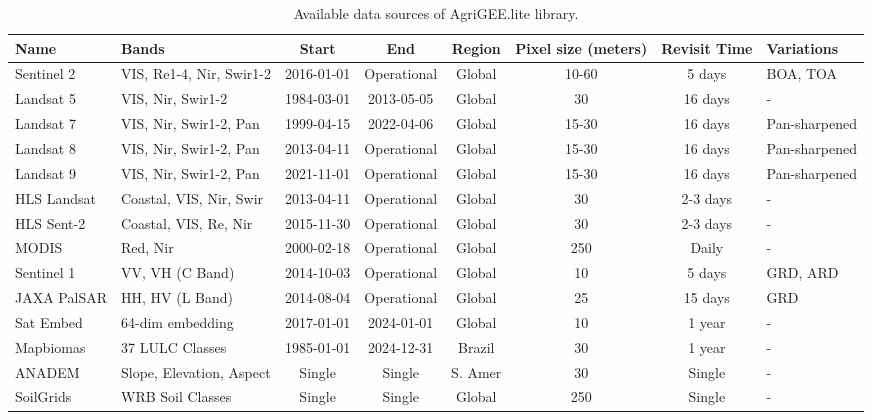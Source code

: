 \begin{landscape}
\begin{table}[ht]
\caption{Available data sources of AgriGEE.lite library.}
\centering
\small
\begin{tabular}{|l|p{4cm}|c|c|c|c|c|p{3cm}|}
\hline
\textbf{Name} & \textbf{Bands} & \textbf{Start} & \textbf{End} & \textbf{Region} & \textbf{Pixel size (meters)} & \textbf{Revisit Time} & \textbf{Variations} \\
\hline
Sentinel 2 & VIS, Re1-4, Nir, Swir1-2 & 2016-01-01 & Operational & Global & 10-60 & 5 days & BOA, TOA \\
\hline
Landsat 5 & VIS, Nir, Swir1-2 & 1984-03-01 & 2013-05-05 & Global & 30 & 16 days & - \\
\hline
Landsat 7 & VIS, Nir, Swir1-2, Pan & 1999-04-15 & 2022-04-06 & Global & 15-30 & 16 days & Pan-sharpened \\
\hline
Landsat 8 & VIS, Nir, Swir1-2, Pan & 2013-04-11 & Operational & Global & 15-30 & 16 days & Pan-sharpened \\
\hline
Landsat 9 & VIS, Nir, Swir1-2, Pan & 2021-11-01 & Operational & Global & 15-30 & 16 days & Pan-sharpened \\
\hline
HLS Landsat & Coastal, VIS, Nir, Swir & 2013-04-11 & Operational & Global & 30 & 2-3 days & - \\
\hline
HLS Sent-2 & Coastal, VIS, Re, Nir & 2015-11-30 & Operational & Global & 30 & 2-3 days & - \\
\hline
MODIS & Red, Nir & 2000-02-18 & Operational & Global & 250 & Daily & - \\
\hline
Sentinel 1 & VV, VH (C Band) & 2014-10-03 & Operational & Global & 10 & 5 days & GRD, ARD \\
\hline
JAXA PalSAR & HH, HV (L Band) & 2014-08-04 & Operational & Global & 25 & 15 days & GRD \\
\hline
Sat Embed & 64-dim embedding & 2017-01-01 & 2024-01-01 & Global & 10 & 1 year & - \\
\hline
Mapbiomas & 37 LULC Classes & 1985-01-01 & 2024-12-31 & Brazil & 30 & 1 year & - \\
\hline
ANADEM & Slope, Elevation, Aspect & Single & Single & S. Amer & 30 & Single & - \\
\hline
SoilGrids & WRB Soil Classes & Single & Single & Global & 250 & Single & - \\
\hline
\end{tabular}
\label{tab:agl_sats}
\end{table}
\end{landscape}
